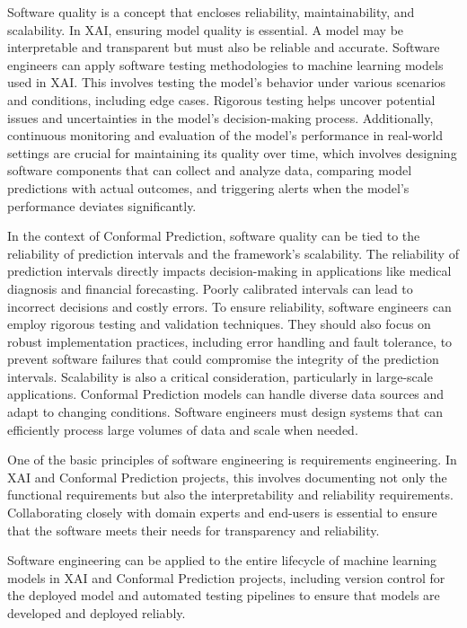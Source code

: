 \documentclass{article}
\begin{document}
Software quality is a concept that encloses reliability, maintainability, and scalability. In XAI, ensuring model quality is essential. A model may be interpretable and transparent but must also be reliable and accurate.
Software engineers can apply software testing methodologies to machine learning models used in XAI. This involves testing the model's behavior under various scenarios and conditions, including edge cases. Rigorous testing helps uncover potential issues and uncertainties in the model's decision-making process. Additionally, continuous monitoring and evaluation of the model's performance in real-world settings are crucial for maintaining its quality over time, which involves designing software components that can collect and analyze data, comparing model predictions with actual outcomes, and triggering alerts when the model's performance deviates significantly.

In the context of Conformal Prediction, software quality can be tied to the reliability of prediction intervals and the framework's scalability. The reliability of prediction intervals directly impacts decision-making in applications like medical diagnosis and financial forecasting. Poorly calibrated intervals can lead to incorrect decisions and costly errors. To ensure reliability, software engineers can employ rigorous testing and validation techniques. They should also focus on robust implementation practices, including error handling and fault tolerance, to prevent software failures that could compromise the integrity of the prediction intervals. Scalability is also a critical consideration, particularly in large-scale applications. Conformal Prediction models can handle diverse data sources and adapt to changing conditions. Software engineers must design systems that can efficiently process large volumes of data and scale when needed.

One of the basic principles of software engineering is requirements engineering. In XAI and Conformal Prediction projects, this involves documenting not only the functional requirements but also the interpretability and reliability requirements. Collaborating closely with domain experts and end-users is essential to ensure that the software meets their needs for transparency and reliability.

Software engineering can be applied to the entire lifecycle of machine learning models in XAI and Conformal Prediction projects, including version control for the deployed model and automated testing pipelines to ensure that models are developed and deployed reliably.
\end{document}
